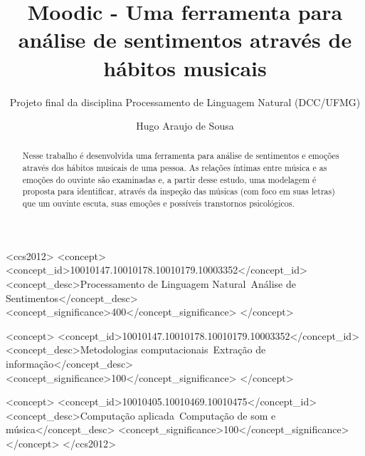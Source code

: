 \documentclass[sigconf]{acmart}
\begin{document}
\title{Moodic - Uma ferramenta para análise de sentimentos através de
hábitos musicais}
\subtitle{Projeto final da disciplina Processamento de Linguagem
Natural (DCC/UFMG)}

\author{Hugo Araujo de Sousa}


\begin{abstract}
  Nesse trabalho é desenvolvida uma ferramenta para análise de sentimentos
  e emoções através dos hábitos musicais de uma pessoa. As relações
  íntimas entre música e as emoções do ouvinte são examinadas e, a
  partir desse estudo, uma modelagem é proposta para identificar,
  através da inspeção das músicas (com foco em suas letras) que um
  ouvinte escuta, suas emoções e possíveis transtornos psicológicos.
\end{abstract}

%
%
\begin{CCSXML}
<ccs2012>
<concept>
<concept_id>10010147.10010178.10010179.10003352</concept_id>
<concept_desc>Processamento de Linguagem Natural~Análise de Sentimentos</concept_desc>
<concept_significance>400</concept_significance>
</concept>

<concept>
<concept_id>10010147.10010178.10010179.10003352</concept_id>
<concept_desc>Metodologias computacionais~Extração de informação</concept_desc>
<concept_significance>100</concept_significance>
</concept>

<concept>
<concept_id>10010405.10010469.10010475</concept_id>
<concept_desc>Computação aplicada~Computação de som e música</concept_desc>
<concept_significance>100</concept_significance>
</concept>
</ccs2012>
\end{CCSXML}


\maketitle




 
\end{document}
